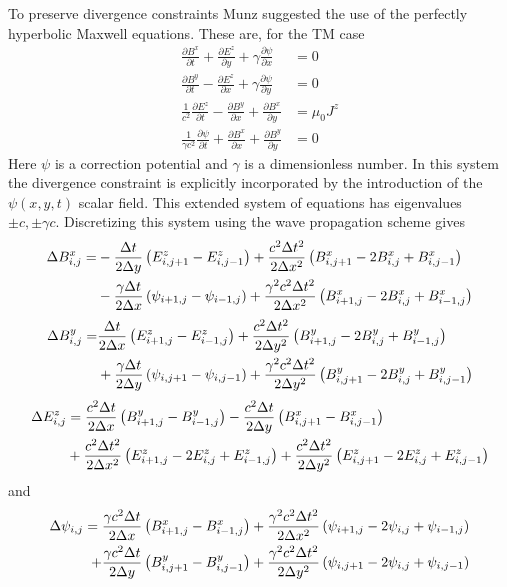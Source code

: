\documentclass[11pt, reqno]{amsart}
\newcommand{\pfrac}[2]{\frac{\partial #1}{\partial #2}}
\begin{document}
To preserve divergence constraints Munz suggested the use of the
perfectly hyperbolic Maxwell equations. These are, for the TM case
\begin{align}
  \pfrac{B^x}{t} + \pfrac{E^z}{y} + \gamma\pfrac{\psi}{x} &= 0 \\
  \pfrac{B^y}{t} - \pfrac{E^z}{x} + \gamma\pfrac{\psi}{y} &= 0 \\
  \frac{1}{c^2}\pfrac{E^z}{t} - \pfrac{B^y}{x} + \pfrac{B^x}{y} &=
  \mu_0 J^z \\
  \frac{1}{\gamma c^2}\pfrac{\psi}{t} + \pfrac{B^x}{x} +
  \pfrac{B^y}{y} &= 0
\end{align}
Here $\psi$ is a correction potential and $\gamma$ is a dimensionless
number. In this system the divergence constraint is explicitly
incorporated by the introduction of the $\psi(x,y,t)$ scalar field.
This extended system of equations has eigenvalues $\pm c, \pm \gamma
c$. Discretizing this system using the wave propagation scheme gives
\begin{align}
  \Delta B^x_{i,j} = &-\frac{\Delta t}{2\Delta y}
  \left(
    E^z_{i,j+1} - E^z_{i,j-1}
  \right)
  +
  \frac{c^2 \Delta t^2}{2\Delta x^2}
  \left(
    B^x_{i,j+1} - 2B^x_{i,j} + B^x_{i,j-1}
  \right) \notag \\
  &-
  \frac{\gamma \Delta t}{2\Delta x}
  \left(
    \psi_{i+1,j}-\psi_{i-1,j}
  \right)
  +
  \frac{\gamma^2 c^2 \Delta t^2}{2\Delta x^2}
  \left(
    B^x_{i+1,j} - 2B^x_{i,j} + B^x_{i-1,j}
  \right)
\end{align}
\begin{align}
  \Delta B^y_{i,j} = 
  &\frac{\Delta t}{2\Delta x}
  \left(
    E^z_{i+1,j} - E^z_{i-1,j}
  \right)
  + \frac{c^2 \Delta t^2}{2\Delta y^2}
  \left(
    B^y_{i+1,j} - 2B^y_{i,j} + B^y_{i-1,j}
  \right) \notag \\
  &+
  \frac{\gamma \Delta t}{2\Delta y}
  \left(
    \psi_{i,j+1}-\psi_{i,j-1}
  \right)
  +
  \frac{\gamma^2 c^2 \Delta t^2}{2\Delta y^2}
  \left(
    B^y_{i,j+1} - 2B^y_{i,j} + B^y_{i,j-1}
  \right)  
\end{align}
\begin{align}
  \Delta E^z_{i,j} &= \frac{c^2 \Delta t}{2\Delta x}
  \left(
    B^y_{i+1,j} - B^y_{i-1,j}
  \right)
  -\frac{c^2 \Delta t}{2\Delta y}
  \left(
    B^x_{i,j+1} - B^x_{i,j-1}
  \right) \notag \\
  &+ \frac{c^2 \Delta t^2}{2\Delta x^2}
  \left(
    E^z_{i+1,j} - 2E^z_{i,j} + E^z_{i-1,j}
  \right)
  + \frac{c^2 \Delta t^2}{2\Delta y^2}
  \left(
    E^z_{i,j+1} - 2E^z_{i,j} + E^z_{i,j-1}
  \right)
\end{align}
and
\begin{align}
  \Delta \psi_{i,j} = 
  \frac{\gamma c^2 \Delta t}{2 \Delta x}
  \left(
    B^x_{i+1,j} - B^x_{i-1,j}
  \right)
  +
  \frac{\gamma^2 c^2 \Delta t^2}{2 \Delta x^2}
  \left(
    \psi_{i+1,j} - 2\psi_{i,j} + \psi_{i-1,j}
  \right) \notag \\
  +
  \frac{\gamma c^2 \Delta t}{2 \Delta y}
  \left(
    B^y_{i,j+1} - B^y_{i,j-1}
  \right)
  +
  \frac{\gamma^2 c^2 \Delta t^2}{2 \Delta y^2}
  \left(
    \psi_{i,j+1} - 2\psi_{i,j} + \psi_{i,j-1}
  \right)
\end{align}
\end{document}
